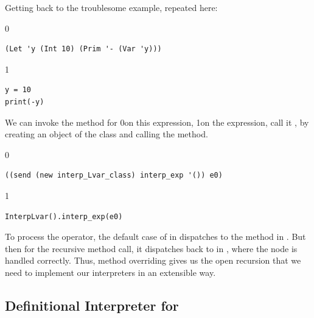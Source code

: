 \documentclass[7x10,nocrop]{TimesAPriori_MIT}%
\def\racketEd{0}
\def\pythonEd{1}
\def\edition{0}
\newcommand{\racket}[1]{{\if\edition\racketEd{#1}\fi}}
\newcommand{\python}[1]{{\if\edition\pythonEd #1\fi}}
\begin{document}
Getting back to the troublesome example, repeated here:
{\if\edition\racketEd  
\begin{lstlisting}
(Let 'y (Int 10) (Prim '- (Var 'y)))
\end{lstlisting}
\fi}
{\if\edition\pythonEd
\begin{lstlisting}
y = 10
print(-y)
\end{lstlisting}
\fi}
\noindent We can invoke the  method for \LangVar{}
\racket{on this expression,}
\python{on the  expression,}
%
call it , by creating an object of the \LangVar{} class
and calling the  method.
{\if\edition\racketEd
\begin{lstlisting}
((send (new interp_Lvar_class) interp_exp '()) e0)
\end{lstlisting}
\fi}
{\if\edition\pythonEd
\begin{lstlisting}
InterpLvar().interp_exp(e0)
\end{lstlisting}
\fi}
\noindent To process the \code{-} operator, the default case of
 in \LangVar{} dispatches to the 
method in \LangInt{}. But then for the recursive method call, it
dispatches back to  in \LangVar{}, where the
 node is handled correctly. Thus, method overriding gives us
the open recursion that we need to implement our interpreters in an
extensible way.


\subsection{Definitional Interpreter for \LangVar{}}
\label{sec:interp-Lvar}
\end{document}
